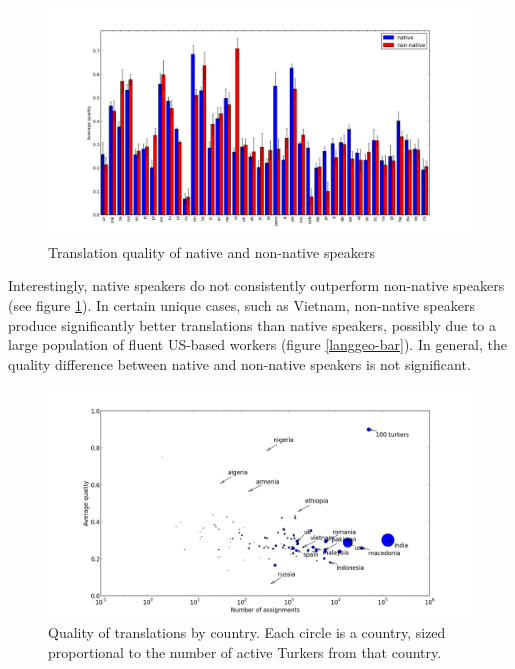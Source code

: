 \documentclass[11pt]{article}
\begin{document}
\begin{figure}[h]
\centering
\includegraphics[width=6in]{figures/quality-natlang-sorted}
\caption{Translation quality of native and non-native speakers}
\label{natlangqual-bar}
\end{figure}

Interestingly, native speakers do not consistently outperform non-native speakers (see figure \ref{natlangqual-bar}). In certain unique cases, such as Vietnam, non-native speakers produce significantly better translations than native speakers, possibly due to a large population of fluent US-based workers (figure \ref{langgeo-bar}). In general, the quality difference between native and non-native speakers is not significant.	


\begin{figure}[h]
\centering
\includegraphics[width=6in]{figures/quality-scatter-avgturkers-country-labeled}
\caption{Quality of translations by country. Each circle is a country, sized proportional to the number of active Turkers from that country.}
\label{quality-scatter}
\end{figure}
\end{document}
